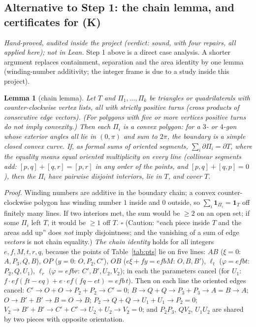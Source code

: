 \documentclass[11pt,reqno]{amsart}
\theoremstyle{plain}
\newtheorem{lemma}[theorem]{Lemma}
\theoremstyle{definition}
\begin{document}
\subsection{Alternative to Step 1: the chain lemma, and certificates for (K)}\label{sub:chain}
\emph{Hand-proved, audited inside the project (verdict: sound, with four repairs, all applied here); not in Lean.} Step 1 above is a direct case analysis. A shorter argument replaces containment, separation and the area identity by one lemma (winding-number additivity; the integer frame is due to a study inside this project).
\begin{lemma}[chain lemma]\label{lem:chain}
Let $T$ and $\Pi_1,\dots,\Pi_k$ be triangles or quadrilaterals with counter-clockwise vertex lists, all with \emph{strictly} positive turns (cross products of consecutive edge vectors). (For polygons with five or more vertices positive turns do not imply convexity.) Then each $\Pi_i$ is a convex polygon: for a $3$- or $4$-gon whose exterior angles all lie in $(0,\pi)$ and sum to $2\pi$, the boundary is a simple closed convex curve. If, as formal sums of oriented segments, $\sum_i\partial\Pi_i=\partial T$, where the equality means equal oriented multiplicity on every line (collinear segments add: $[p,q]+[q,r]=[p,r]$ in any order of the points, and $[p,q]+[q,p]=0$), then the $\Pi_i$ have pairwise disjoint interiors, lie in $T$, and cover $T$.
\end{lemma}
\noindent\emph{Proof.} Winding numbers are additive in the boundary chain; a convex counter-clockwise polygon has winding number $1$ inside and $0$ outside, so $\sum_i\mathbf 1_{\Pi_i}=\mathbf 1_T$ off finitely many lines. If two interiors met, the sum would be $\ge2$ on an open set; if some $\Pi_i$ left $T$, it would be $\ge1$ off $T$. $\square$
(Caution: ``each piece inside $T$ and the areas add up'' does \emph{not} imply disjointness; and the vanishing of a sum of edge \emph{vectors} is not chain equality.)
\emph{The chain identity} holds for all integers $e,f,M,t,r,q$, because the points of Table~\ref{tab:pts} lie on five lines: $AB$ ($\xi=0$: $A,P_3,Q,B$), $OP$ ($y=0$: $O,P_2,C'$), $OB$ ($e\xi+fy=efbM$: $O,B,B'$), $\ell_t$ ($\varphi=efbt$: $P_2,Q,U_1$), $\ell_r$ ($\varphi=efbr$: $C',B',U_2,V_2$); in each the parameters cancel (for $U_1$: $f\cdot ef(ft-eq)+e\cdot ef(fq-et)=efb\,t$). Then on each line the oriented edges cancel: $C'\to O+O\to P_2+P_2\to C'=0$; $B\to Q+Q\to P_3+P_3\to A=B\to A$; $O\to B'+B'\to B=O\to B$; $P_2\to Q+Q\to U_1+U_1\to P_2=0$; $V_2\to B'+B'\to C'+C'\to U_2+U_2\to V_2=0$; and $P_2P_3$, $QV_2$, $U_1U_2$ are shared by two pieces with opposite orientation.
\end{document}
